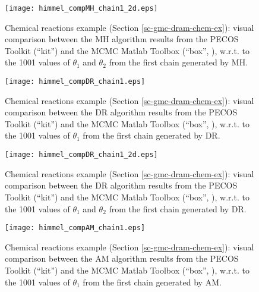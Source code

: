 \begin{figure}[h!]
\begin{center}
\texttt{[image: himmel\_compMH\_chain1\_2d.eps]}
\end{center}
\caption{Chemical reactions example (Section \ref{sc-gmc-dram-chem-ex}):
visual comparison between the MH algorithm results from the PECOS Toolkit (``kit'') and the MCMC Matlab Toolbox (``box'', \cite{mcmctool}), w.r.t. to the 1001 values of $\theta_1$ and $\theta_2$ from the first chain generated by MH.
}
\label{fig-dram-chem-ex-comparison-MH-theta1-chain1-2d}
\end{figure}

\begin{figure}[h!]
\begin{center}
\texttt{[image: himmel\_compDR\_chain1.eps]}
\end{center}
\caption{Chemical reactions example (Section \ref{sc-gmc-dram-chem-ex}):
visual comparison between the DR algorithm results from the PECOS Toolkit (``kit'') and the MCMC Matlab Toolbox (``box'', \cite{mcmctool}), w.r.t. to the 1001 values of $\theta_1$ from the first chain generated by DR.
}
\label{fig-dram-chem-ex-comparison-DR-theta1-chain1}
\end{figure}

\begin{figure}[h!]
\begin{center}
\texttt{[image: himmel\_compDR\_chain1\_2d.eps]}
\end{center}
\caption{Chemical reactions example (Section \ref{sc-gmc-dram-chem-ex}):
visual comparison between the DR algorithm results from the PECOS Toolkit (``kit'') and the MCMC Matlab Toolbox (``box'', \cite{mcmctool}), w.r.t. to the 1001 values of $\theta_1$ and $\theta_2$ from the first chain generated by DR.
}
\label{fig-dram-chem-ex-comparison-DR-theta1-chain1-2d}
\end{figure}

\begin{figure}[h!]
\begin{center}
\texttt{[image: himmel\_compAM\_chain1.eps]}
\end{center}
\caption{Chemical reactions example (Section \ref{sc-gmc-dram-chem-ex}):
visual comparison between the AM algorithm results from the PECOS Toolkit (``kit'') and the MCMC Matlab Toolbox (``box'', \cite{mcmctool}), w.r.t. to the 1001 values of $\theta_1$ from the first chain generated by AM.
}
\label{fig-dram-chem-ex-comparison-AM-theta1-chain1}
\end{figure}

